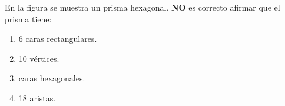 \documentclass[fleqn]{article}
\begin{document}
\begin{enumerate}
\begin{minipage}{.45\textwidth}
\end{minipage}
\begin{minipage}{.45\textwidth}
\item En la figura se muestra un prisma hexagonal. \textbf{NO} es correcto afirmar que el prisma tiene:
\begin{enumerate}
\item 6 caras rectangulares.
\item 10 vértices.
\item caras hexagonales.
\item 18 aristas.
\end{enumerate}
\end{minipage}


\end{enumerate}
\end{document}
